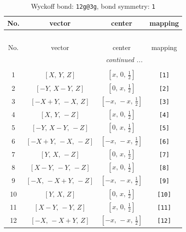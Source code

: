 \documentclass[fleqn,8pt]{jsarticle}
\begin{document}
\begin{longtable}{cccc}
\caption{Wyckoff bond: {\tt 12g@3g}, bond symmetry: {\tt 1}}
 \\
 \hline \hline
No. & vector & center & mapping \\ \hline \endfirsthead

\multicolumn{3}{l}{\tablename\ \thetable{}} \\
 \hline \hline
No. & vector & center & mapping \\ \hline \endhead

 \hline \hline
\multicolumn{3}{r}{\footnotesize\it continued ...} \\ \endfoot

 \hline \hline
\multicolumn{3}{r}{} \\ \endlastfoot

1 & $\left[ X,\, Y,\, Z \right]$ & $\left[ x,\, 0,\, \frac{1}{2} \right]$ & {\tt [1]} \\ \hline
2 & $\left[ - Y,\, X - Y,\, Z \right]$ & $\left[ 0,\, x,\, \frac{1}{2} \right]$ & {\tt [2]} \\ \hline
3 & $\left[ - X + Y,\, - X,\, Z \right]$ & $\left[ - x,\, - x,\, \frac{1}{2} \right]$ & {\tt [3]} \\ \hline
4 & $\left[ X,\, Y,\, - Z \right]$ & $\left[ x,\, 0,\, \frac{1}{2} \right]$ & {\tt [4]} \\ \hline
5 & $\left[ - Y,\, X - Y,\, - Z \right]$ & $\left[ 0,\, x,\, \frac{1}{2} \right]$ & {\tt [5]} \\ \hline
6 & $\left[ - X + Y,\, - X,\, - Z \right]$ & $\left[ - x,\, - x,\, \frac{1}{2} \right]$ & {\tt [6]} \\ \hline
7 & $\left[ Y,\, X,\, - Z \right]$ & $\left[ 0,\, x,\, \frac{1}{2} \right]$ & {\tt [7]} \\ \hline
8 & $\left[ X - Y,\, - Y,\, - Z \right]$ & $\left[ x,\, 0,\, \frac{1}{2} \right]$ & {\tt [8]} \\ \hline
9 & $\left[ - X,\, - X + Y,\, - Z \right]$ & $\left[ - x,\, - x,\, \frac{1}{2} \right]$ & {\tt [9]} \\ \hline
10 & $\left[ Y,\, X,\, Z \right]$ & $\left[ 0,\, x,\, \frac{1}{2} \right]$ & {\tt [10]} \\ \hline
11 & $\left[ X - Y,\, - Y,\, Z \right]$ & $\left[ x,\, 0,\, \frac{1}{2} \right]$ & {\tt [11]} \\ \hline
12 & $\left[ - X,\, - X + Y,\, Z \right]$ & $\left[ - x,\, - x,\, \frac{1}{2} \right]$ & {\tt [12]} \\
\end{longtable}
\end{document}
